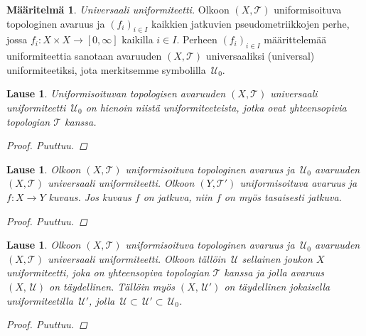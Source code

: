 \documentclass[12pt,a4paper,leqno]{report}
\newcommand{\U}{\,\mathcal{U}}
\newcommand{\T}{\mathcal{T}}
\theoremstyle{plain}
\newtheorem{lause}[equation]{Lause}
\theoremstyle{definition}
\newtheorem{maar}[equation]{Määritelmä}
\theoremstyle{remark}
\begin{document}
\begin{maar}
\emph{Universaali uniformiteetti.} 
Olkoon $(X,\T)$ uniformisoituva topologinen avaruus ja 
$(f_i)_{i\in I}$ kaikkien jatkuvien pseudometriikkojen perhe, 
jossa $f_i\colon X\times X\rightarrow [0,\infty]$ 
kaikilla $i\in I$. 
Perheen $(f_i)_{i\in I}$ määrittelemää uniformiteettia sanotaan avaruuden $(X,\T)$ universaaliksi (universal) uniformiteetiksi, 
jota merkitsemme symbolilla $\U_0$. 
\end{maar}
\begin{lause}
Uniformisoituvan topologisen avaruuden $(X,\T)$ universaali uniformiteetti $\U_0$ on hienoin niistä uniformiteeteista, jotka ovat yhteensopivia topologian $\T$ kanssa. 
\begin{proof}
Puuttuu.
\end{proof}
\end{lause}
\begin{lause}
Olkoon $(X,\T)$ uniformisoituva topologinen avaruus ja 
$\U_0$ avaruuden $(X,\T)$ universaali uniformiteetti. 
Olkoon $(Y,\T')$ uniformisoituva avaruus ja $f\colon X\rightarrow Y$ 
kuvaus. 
Jos kuvaus $f$ on jatkuva, %
niin $f$ on myös tasaisesti jatkuva. %
\begin{proof}
Puuttuu.
\end{proof}
\end{lause}
\begin{lause}
Olkoon $(X,\T)$ uniformisoituva topologinen avaruus ja 
$\U_0$ avaruuden $(X,\T)$ universaali uniformiteetti. 
Olkoon tällöin  
$\U$ sellainen joukon $X$ uniformiteetti, 
joka on yhteensopiva topologian $\T$ kanssa ja 
jolla avaruus $(X,\U)$ on täydellinen. 
Tällöin myös $(X,\U')$ on täydellinen jokaisella 
uniformiteetilla $\U'$, jolla 
$\U\subset\U'\subset\U_0$.
\begin{proof}
Puuttuu.
\end{proof}
\end{lause}
%
%
\end{document}

